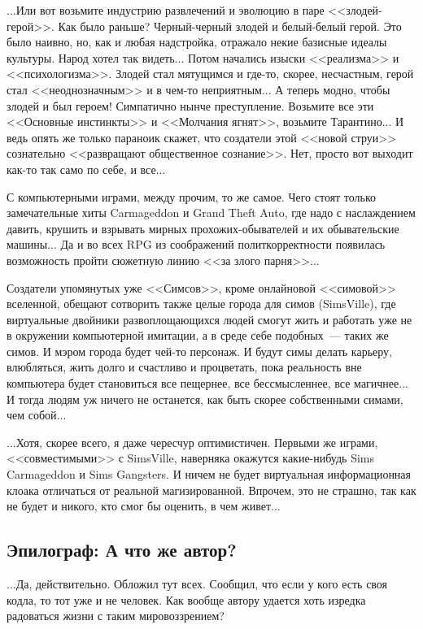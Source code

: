 \documentclass{scrbook}
\newcommand{\flqq}{<<}
\newcommand{\frqq}{>>}
\newcommand{\mdash}{~--- }
\newcommand{\essaysection}[1]{\subsection*{#1}\nopagebreak}
\begin{document}
...Или вот возьмите индустрию развлечений и эволюцию в паре {\flqq}злодей-герой{\frqq}. Как было раньше? Черный-черный злодей и белый-белый герой. Это было наивно, но, как и любая надстройка, отражало некие базисные идеалы культуры. Народ хотел так видеть... Потом начались изыски {\flqq}реализма{\frqq} и {\flqq}психологизма{\frqq}. Злодей стал мятущимся и где-то, скорее, несчастным, герой стал {\flqq}неоднозначным{\frqq} и в чем-то неприятным... А теперь модно, чтобы злодей и был героем! Симпатично нынче преступление. Возьмите все эти {\flqq}Основные инстинкты{\frqq} и {\flqq}Молчания ягнят{\frqq}, возьмите Тарантино... И ведь опять же только параноик скажет, что создатели этой {\flqq}новой струи{\frqq} сознательно {\flqq}развращают общественное сознание{\frqq}. Нет, просто вот выходит как-то так само по себе, и все...

С компьютерными играми, между прочим, то же самое. Чего стоят только замечательные хиты Carmageddon и Grand Theft Auto, где надо с наслаждением давить, крушить и взрывать мирных прохожих-обывателей и их обывательские машины... Да и во всех RPG из соображений политкорректности появилась возможность пройти сюжетную линию {\flqq}за злого парня{\frqq}...

Создатели упомянутых уже {\flqq}Симсов{\frqq}, кроме онлайновой {\flqq}симовой{\frqq} вселенной, обещают сотворить также целые города для симов (SimsVille), где виртуальные двойники развоплощающихся людей смогут жить и работать уже не в окружении компьютерной имитации, а в среде себе подобных{\mdash}таких же симов. И мэром города будет чей-то персонаж. И будут симы делать карьеру, влюбляться, жить долго и счастливо и процветать, пока реальность вне компьютера будет становиться все пещернее, все бессмысленнее, все магичнее... И тогда людям уж ничего не останется, как быть скорее собственными симами, чем собой...

...Хотя, скорее всего, я даже чересчур оптимистичен. Первыми же играми, {\flqq}совместимыми{\frqq} с SimsVille, наверняка окажутся какие-нибудь Sims Carmageddon и Sims Gangsters. И ничем не будет виртуальная информационная клоака отличаться от реальной магизированной. Впрочем, это не страшно, так как не будет и никого, кто смог бы оценить, в чем живет...

\essaysection{Эпилограф: А что же автор?}

...Да, действительно. Обложил тут всех. Сообщил, что если у кого есть своя кодла, то тот уже и не человек. Как вообще автору удается хоть изредка радоваться жизни с таким мировоззрением?
\end{document}
